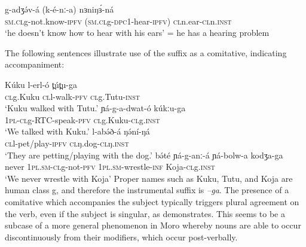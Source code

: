 \ea \gll	g-adʒə́v-á 	(k-é-nː-a) 	nɜniŋɜ́-ná	\\
\textsc{sm.cl}g-not.know-\textsc{ipfv} 	(\textsc{sm.cl}g-\textsc{dpc}1-hear-\textsc{ipfv})	\textsc{cl}n.ear-\textsc{cl}n.\textsc{inst}\\
\glt ‘he doesn’t know how to hear with his ears’ = he has a hearing problem
\z 

The following sentences illustrate use of the suffix as a comitative, indicating accompaniment:

\ea
	\ea	\gll Kúku        l-erl-ó             t̪út̪u-ga	\\
\textsc{cl}g.Kuku \textsc{cl}l-walk-\textsc{pfv} \textsc{cl}g.Tutu-\textsc{inst}		\\
		\glt `Kuku walked with Tutu.'\label{ex:ch6:plcomit}
	\ex \gll	ɲá-g-a-dwat-ó kúkːu-ga	\\
1\textsc{pl}-\textsc{cl}g-RTC-speak-\textsc{pfv} \textsc{cl}g.Kuku-\textsc{cl}g.\textsc{inst}			\\
		\glt ‘We talked with Kuku.’
	\ex \gll 	l-abə́ð-á ŋə́ní-ŋá \\
	\textsc{cl}l-pet/play-\textsc{ipfv} \textsc{cl}ŋ.dog-\textsc{cl}ŋ.\textsc{inst} \\
		\glt `They are petting/playing with the dog.’
	\ex	\gll	bə́té	ɲá-g-anː-á 	ɲá-bolw-a 		kodʒa-ga \\
never	1\textsc{pl}.\textsc{sm}-\textsc{cl}g-not-\textsc{pfv}	1\textsc{pl}.\textsc{sm}-wrestle-\textsc{inf}	Koja-\textsc{cl}g.\textsc{inst}\\
		\glt 	‘We never wrestle with Koja’ 
\z \z 
Proper names such as Kuku, Tutu, and Koja are human class g, and therefore the instrumental suffix is \textit{–ga}. The presence of a comitative which accompanies the subject typically triggers plural agreement on the verb, even if the subject is singular, as  demonstrates. This seems to be a subcase of a more general phenomenon in Moro whereby nouns are able to occur discontinuously from their modifiers, which occur post-verbally. 


%

